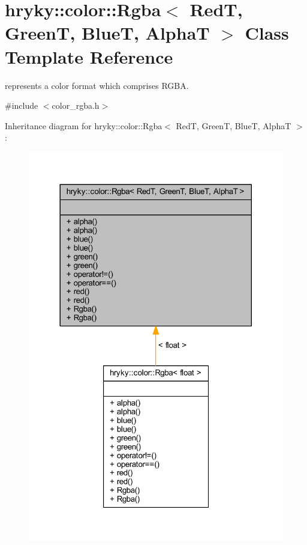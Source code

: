 \hypertarget{classhryky_1_1color_1_1_rgba}{\section{hryky\-:\-:color\-:\-:Rgba$<$ Red\-T, Green\-T, Blue\-T, Alpha\-T $>$ Class Template Reference}
\label{classhryky_1_1color_1_1_rgba}
}


represents a color format which comprises R\-G\-B\-A.  




{\ttfamily \#include $<$color\-\_\-rgba.\-h$>$}



Inheritance diagram for hryky\-:\-:color\-:\-:Rgba$<$ Red\-T, Green\-T, Blue\-T, Alpha\-T $>$\-:\nopagebreak
\begin{figure}[H]
\begin{center}
\leavevmode
\includegraphics[width=320pt]{classhryky_1_1color_1_1_rgba__inherit__graph}
\end{center}
\end{figure}
